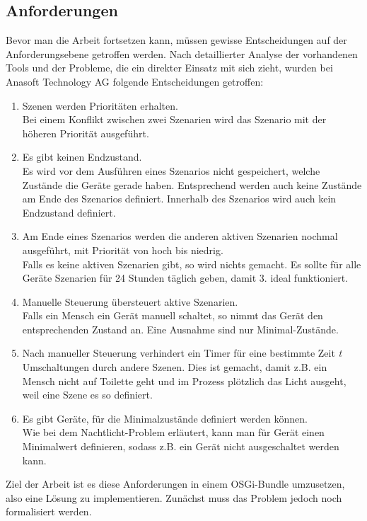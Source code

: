 \subsection{Anforderungen}
Bevor man die Arbeit fortsetzen kann, müssen gewisse Entscheidungen auf der Anforderungsebene getroffen werden. Nach detaillierter Analyse der vorhandenen Tools und der Probleme, die ein direkter Einsatz mit sich zieht, wurden bei Anasoft Technology AG folgende Entscheidungen getroffen:
\begin{enumerate}
	\item Szenen werden Prioritäten erhalten. \\
	Bei einem Konflikt zwischen zwei Szenarien wird das Szenario mit der höheren Priorität ausgeführt.
	\item Es gibt keinen Endzustand.\\
	Es wird vor dem Ausführen eines Szenarios nicht gespeichert, welche Zustände die Geräte gerade haben. Entsprechend werden auch keine Zustände am Ende des Szenarios definiert. Innerhalb des Szenarios wird auch kein Endzustand definiert.
	\item Am Ende eines Szenarios werden die anderen aktiven Szenarien nochmal ausgeführt, mit Priorität von hoch bis niedrig.\\
	Falls es keine aktiven Szenarien gibt, so wird nichts gemacht. Es sollte für alle Geräte Szenarien für 24 Stunden täglich geben, damit 3. ideal funktioniert.
	\item Manuelle Steuerung übersteuert aktive Szenarien.\\
	Falls ein Mensch ein Gerät manuell schaltet, so nimmt das Gerät den entsprechenden Zustand an. Eine Ausnahme sind nur Minimal-Zustände.
	\item Nach manueller Steuerung verhindert ein Timer für eine bestimmte Zeit \textit{t} Umschaltungen durch andere Szenen. Dies ist gemacht, damit z.B. ein Mensch nicht auf Toilette geht und im Prozess plötzlich das Licht ausgeht, weil eine Szene es so definiert.
	\item Es gibt Geräte, für die Minimalzustände definiert werden können.\\
	Wie bei dem Nachtlicht-Problem erläutert, kann man für Gerät einen Minimalwert definieren, sodass z.B. ein Gerät nicht ausgeschaltet werden kann.
\end{enumerate}
Ziel der Arbeit ist es diese Anforderungen in einem OSGi-Bundle umzusetzen, also eine Lösung zu implementieren. Zunächst muss das Problem jedoch noch formalisiert werden.	